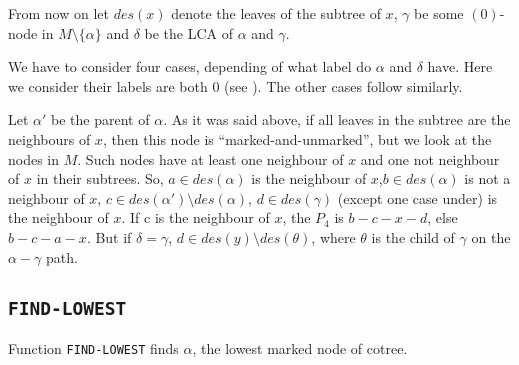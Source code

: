 From now on let $des (x)$ denote the leaves of the subtree of $x$, $\gamma$ be some $(0)$-node in $M \setminus \{\alpha\}$ and $\delta$ be the LCA of $\alpha$ and $\gamma$. 

We have to consider four cases, depending of what label do $\alpha$ and $\delta$ have. Here we consider their labels are both $0$ (see ). The other cases follow similarly.

Let $\alpha'$ be the parent of $\alpha$. As it was said above, if all leaves in the subtree are the neighbours of $x$, then this node is ``marked-and-unmarked'', but we look at the nodes in $M$. Such nodes have at least one neighbour of $x$ and one not neighbour of $x$ in their subtrees. So, $a \in des(\alpha)$ is the neighbour of $x$,$b \in des(\alpha)$ is not a neighbour of $x$, $c \in des (\alpha') \setminus des(\alpha)$, $d \in des (\gamma)$ (except one case under) is the neighbour of $x$. If c is the neighbour of $x$, the $P_4$ is $b-c-x-d$, else $b-c-a-x$. But if $\delta = \gamma$,  $d \in des(y) \setminus des(\theta)$, where $\theta$ is the child of $\gamma$ on the $\alpha - \gamma$ path. 



\subsection{\texttt{FIND-LOWEST}}
Function \texttt{FIND-LOWEST} finds $\alpha$, the lowest marked node of cotree. 

